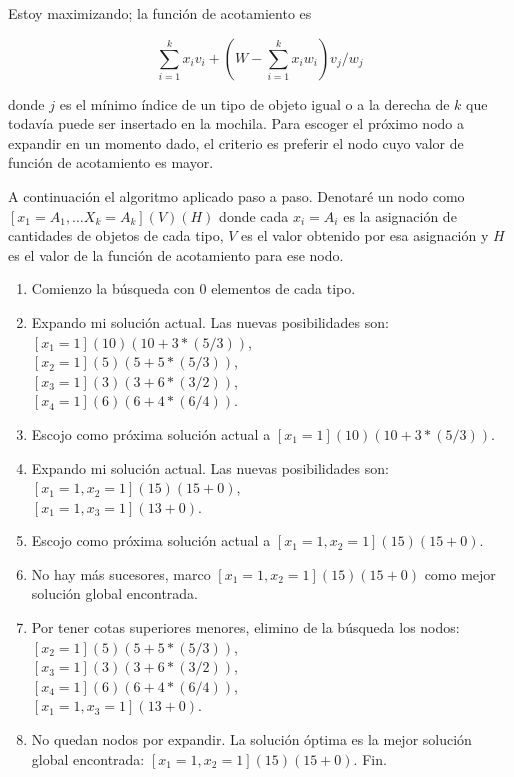 \documentclass{article}
\begin{document}
Estoy maximizando; la función de acotamiento es

$$
\sum_{i=1}^k x_i v_i + \left( W - \sum_{i=1}^k x_i w_i \right) v_{j}/w_{j}
$$

donde $j$ es el mínimo índice de un tipo de objeto igual o a la derecha de $k$ que todavía
puede ser insertado en la mochila. Para escoger el próximo nodo a expandir en un momento dado, el criterio es
preferir el nodo cuyo valor de función de acotamiento es mayor.

A continuación el algoritmo aplicado paso a paso. Denotaré un nodo como $[x_1=A_1, \ldots X_k=A_k] (V)(H)$ donde
cada $x_i = A_i$ es la asignación de cantidades de objetos de cada tipo, $V$ es el valor obtenido por esa asignación y $H$ es el valor
de la función de acotamiento para ese nodo.

\renewcommand{\labelenumi}{\arabic{enumi}.}

\begin{enumerate}

\item Comienzo la búsqueda con $0$ elementos de cada tipo.

\item Expando mi solución actual. Las nuevas posibilidades son: \\
$[x_1=1] (10)(10+3*(5/3))$,\\
$[x_2=1] (5)(5+5*(5/3))$,\\
$[x_3=1] (3)(3+6*(3/2))$,\\
$[x_4=1] (6)(6+4*(6/4))$.

\item Escojo como próxima solución actual a $[x_1=1] (10)(10+3*(5/3))$.

\item Expando mi solución actual. Las nuevas posibilidades son:\\
$[x_1=1,x_2=1] (15)(15+0)$,\\
$[x_1=1,x_3=1] (13+0)$.

\item Escojo como próxima solución actual a $[x_1=1,x_2=1] (15)(15+0)$.

\item No hay más sucesores, marco $[x_1=1,x_2=1] (15)(15+0)$ como mejor solución global encontrada.

\item Por tener cotas superiores menores, elimino de la búsqueda los nodos:\\
$[x_2=1] (5)(5+5*(5/3))$,\\
$[x_3=1] (3)(3+6*(3/2))$,\\
$[x_4=1] (6)(6+4*(6/4))$,\\
$[x_1=1,x_3=1] (13+0)$.

\item No quedan nodos por expandir. La solución óptima es la mejor solución global encontrada: $[x_1=1,x_2=1] (15)(15+0)$. Fin.

\end{enumerate}
\end{document}
